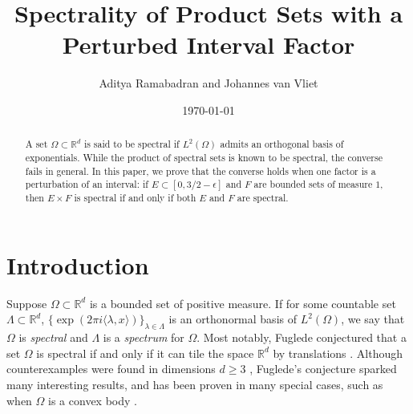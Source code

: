 \documentclass{amsart}
\newcommand{\R}{\mathbb{R}}
\begin{document}
\title[Spectrality of Product Sets with a Perturbed Interval Factor]{Spectrality of Product Sets with a Perturbed Interval Factor}


\author[Ramabadran and van Vliet]{Aditya Ramabadran and Johannes van Vliet}





\address{Aditya Ramabadran
\newline \indent Department of Mathematics, University of California, Berkeley\indent 
\newline \indent  Evans Hall, Berkeley, CA 94720 \indent }

\address{Johannes van Vliet
\newline \indent Department of Mathematics, University of Washington\indent 
\newline \indent  C138 Padelford Hall Box 354350, Seattle, WA 98195,\indent }





\date{\today}

\begin{abstract}
A set $\Omega \subset \mathbb{R}^d$ is said to be spectral if $L^2(\Omega)$ admits an orthogonal basis of exponentials. While the product of spectral sets is known to be spectral, the converse fails in general. In this paper, we prove that the converse holds when one factor is a perturbation of an interval: if $E \subset [0,3/2 - \epsilon]$ and $F$ are bounded sets of measure $1$, then $E \times F$ is spectral if and only if both $E$ and $F$ are spectral.
\end{abstract}
\maketitle

\section{Introduction}

Suppose $\Omega \subset \R^d$ is a bounded set of positive measure. If for some countable set $\Lambda \subset \R^d$, $\{ \exp(2\pi i \langle\lambda,x\rangle ) \}_{\lambda \in \Lambda}$ is an orthonormal basis of $L^2(\Omega)$, we say that $\Omega$ is \textit{spectral} and $\Lambda$ is a \textit{spectrum} for $\Omega$. Most notably, Fuglede conjectured that a set $\Omega$ is spectral if and only if it can tile the space $\R^d$ by translations \cite{Fug74}. Although counterexamples were found in dimensions $d \ge 3$ \cite{T05, Mat05, KM06}, Fuglede's conjecture sparked many interesting results, and has been proven in many special cases, such as when $\Omega$ is a convex body \cite{LM22}.
\end{document}

